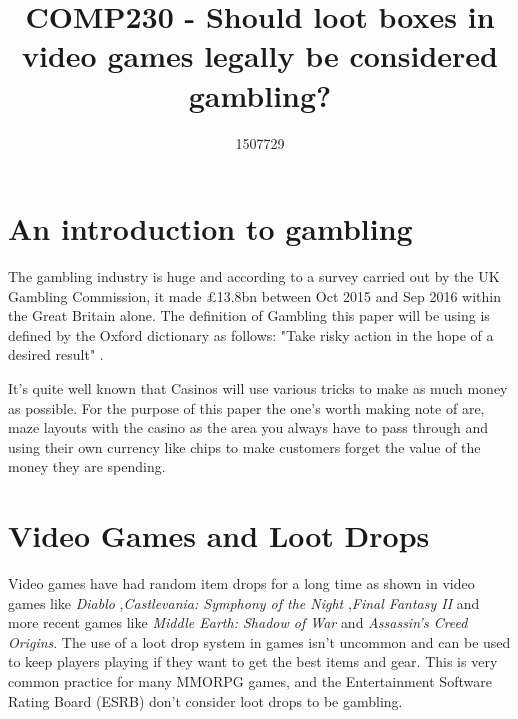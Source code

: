 \documentclass{scrartcl}
\title{COMP230 - Should loot boxes in video games legally be considered gambling?}
\author{1507729}
\begin{document}
\maketitle


\section{An introduction to gambling}
The gambling industry is huge and according to a survey carried out by the UK Gambling Commission, it made £13.8bn between Oct 2015 and Sep 2016 within the Great Britain alone. \cite{GamCom2017Stats} The definition of Gambling this paper will be using is defined by the Oxford dictionary as follows: "Take risky action in the hope of a desired result" \cite{Oxford2017Gamble}. 

It's quite well known that Casinos will use various tricks to make as much money as possible. \cite{Casino2014design, Libby2014Tricks} For the purpose of this paper the one's worth making note of are, maze layouts with the casino as the area you always have to pass through and using their own currency like chips to make customers forget the value of the money they are spending.

\section{Video Games and Loot Drops}
Video games have had random item drops for a long time as shown in video games like \textit{Diablo} \cite{Blizzard1996Diablo},\textit {Castlevania: Symphony of the Night} \cite{Konami1997Castlevania},\textit {Final Fantasy II} \cite{Square1988Final}and more recent games like \textit {Middle Earth: Shadow of War} \cite{Monolith2017Middle} and \textit {Assassin's Creed Origins}. \cite{Ubisoft2017Assassin} The use of a loot drop system in games isn't uncommon and can be used to keep players playing if they want to get the best items and gear. This is very common practice for many MMORPG games, and the Entertainment Software Rating Board (ESRB) don't consider loot drops to be gambling.
\end{document}
